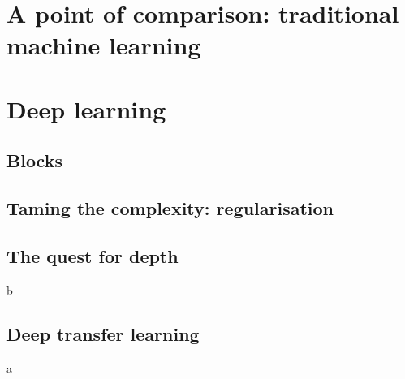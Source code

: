 \section{A point of comparison: traditional machine learning}
\section{Deep learning}
\subsection{Blocks}
\subsection{Taming the complexity: regularisation}
\subsection{The quest for depth}
b
\subsection{Deep transfer learning}
a

